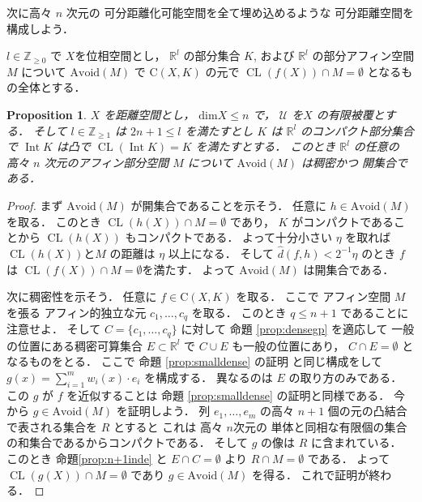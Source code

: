 \documentclass[leqno, a4paper, 12pt]{jsarticle}
\theoremstyle{plain}
\newtheorem{prop}[thm]{Proposition}
\theoremstyle{definition}
\theoremstyle{remark}
\newcommand{\zz}{\mathbb{Z}}
\newcommand{\rr}{\mathbb{R}}
\DeclareMathOperator{\cl}{\mathrm{CL}}
\DeclareMathOperator{\nai}{\mathrm{Int}}
\newcommand{\yodim}{\mathrm{dim}}
\newcommand{\yocovf}[1]{\mathscr{#1}}
\newcommand{\yosupmet}[1]{\widehat{#1}}
\newcommand{\yofuncsp}[2]{\mathrm{C}(#1, #2)}
\newcommand{\yoavoid}[1]{\mathrm{Avoid}(#1)}
\numberwithin{equation}{section}
\begin{document}
次に高々
$n$
次元の
可分距離化可能空間を全て埋め込めるような
可分距離空間を構成しよう．

$l\in \zz_{\ge 0}$
で
$X$を位相空間とし，
$\rr^{l}$
の部分集合
$K$, 
および
$\rr^{l}$
の部分アフィン空間
$M$
について
$\yoavoid{M}$
で
$\yofuncsp{X}{K}$
の元で
$\cl (f(X))\cap M=\emptyset$
となるもの全体とする．
\begin{prop}\label{prop:sum:avoidopen}
$X$
を距離空間とし，
$\yodim X\le n$
で，
$\yocovf{U}$
を$X$
の有限被覆とする．
そして
$l\in \zz_{\ge 1}$
は
$2n+1\le l$
を満たすとし
$K$
は
$\rr^{l}$
のコンパクト部分集合で
$\nai K$
は凸で
$\cl (\nai K)=K$
を満たすとする．
このとき
$\rr^{l}$
の任意の
高々
$n$
次元のアフィン部分空間
$M$
について
$\yoavoid{M}$
は稠密かつ
開集合である．
\end{prop}
\begin{proof}
まず
$\yoavoid{M}$
が開集合であることを示そう．
任意に
$h\in \yoavoid{M}$
を取る．
このとき
$\cl(h(X))\cap M=\emptyset$
であり，
$K$
がコンパクトであることから
$\cl(h(X))$
もコンパクトである．
よって十分小さい
$\eta$
を取れば
$\cl(h(X))$と$M$
の距離は
$\eta$
以上になる．
そして
$\yosupmet{d}(f, h)<2^{-1}\eta$
のとき
$f$
は
$\cl(f(X))\cap M=\emptyset$を満たす．
よって
$\yoavoid{M}$
は開集合である．

次に稠密性を示そう．
任意に
$f\in \yofuncsp{X}{K}$
を取る．
ここで
アフィン空間
$M$
を張る
アフィン的独立な元
$c_{1}, \dots, c_{q}$
を取る．
このとき
$q\le n+1$
であることに注意せよ．
そして
$C=\{c_{1}, \dots, c_{q}\}$
に対して
命題
\ref{prop:densegp}
を適応して
一般の位置にある稠密可算集合
$E\subset \rr^{l}$
で
$C\cup E$
も一般の位置にあり，
$C\cap E=\emptyset$
となるものをとる．
ここで
命題
\ref{prop:smalldense}
の証明
と同じ構成をして
$g(x)=\sum_{i=1}^{m}w_{i}(x)\cdot e_{i}$
を構成する．
異なるのは
$E$
の取り方のみである．
この
$g$
が
$f$
を近似することは
命題
\ref{prop:smalldense}
の証明と同様である．
今から
$g\in \yoavoid{M}$
を証明しよう．
列
$e_{1}, \dots, e_{m}$
の高々
$n+1$
個の元の凸結合で表される集合を
$R$
とすると
これは
高々
$n$次元の
単体と同相な有限個の集合の和集合であるからコンパクトである．
そして
$g$
の像は
$R$
に含まれている．
このとき
命題\ref{prop:n+1inde}
と
$E\cap C=\emptyset$
より
$R\cap M=\emptyset$
である．
よって
$\cl(g(X))\cap M=\emptyset$
であり
$g\in \yoavoid{M}$
を得る．
これで証明が終わる．
\end{proof}
\end{document}
